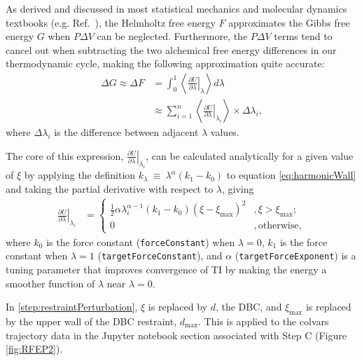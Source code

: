 \documentclass[9pt,tutorial]{Styling/livecoms}
\begin{document}
As derived and discussed in most statistical mechanics and molecular dynamics textbooks (e.g. Ref.~), the Helmholtz free energy $F$ approximates the Gibbs free energy $G$ when $P\Delta V$ can be neglected.
Furthermore, the $P\Delta V$ terms tend to cancel out when subtracting the two alchemical free energy differences in our thermodynamic cycle, making the following approximation quite accurate:
\begin{align}\label{eq:thermodynamicintegration}
    \Delta G \approx \Delta F &= \int_{0}^{1} \left\langle \left.\frac{\partial U}{\partial \lambda}\right|_{\lambda} \right\rangle d\lambda\\
    &\approx \sum_{i=1}^n \left\langle \left.
    \frac{\partial U}{\partial \lambda} \right|_{\lambda_i} \right\rangle \times \Delta \lambda_i,
\end{align}
where $\Delta \lambda_i$ is the difference between adjacent $\lambda$ values.

The core of this expression, $\left.\frac{\partial U}{\partial \lambda}\right|_{\lambda_i}$, can be calculated analytically for a given value of $\xi$ by applying the definition $k_\lambda~\equiv~\lambda^\alpha\left (k_1-k_0\right )$ to equation \ref{eq:harmonicWall} and taking the partial derivative with respect to $\lambda$, giving
 \begin{align}\label{eq:dUwalldLambda}
    \left. \frac{\partial U}{\partial \lambda} \right|_{\lambda_i} &=\begin{cases}
        \frac{1}{2}\alpha\lambda_i^{\alpha-1}(k_1 - k_0)(\xi-\xi_\mathrm{max})^2&, \xi>\xi_\mathrm{max};\\
        0 &, \text{otherwise},
    \end{cases} 
 \end{align}
where $k_0$ is the force constant (\texttt{forceConstant}) when $\lambda=0$, $k_1$ is the  force constant when $\lambda=1$ (\texttt{targetForceConstant}), and $\alpha$ (\texttt{targetForceExponent}) is a tuning parameter that improves convergence of TI by making the energy a smoother function of $\lambda$ near $\lambda=0$.

In \ref{step:restraintPerturbation}, $\xi$ is replaced by $d$, the DBC, and $\xi_\mathrm{max}$ is replaced by the upper wall of the DBC restraint, $d_\mathrm{max}$.
This is applied to the colvars trajectory data in the Jupyter notebook section associated with Step C (Figure \ref{fig:RFEP2}). 
\end{document}
